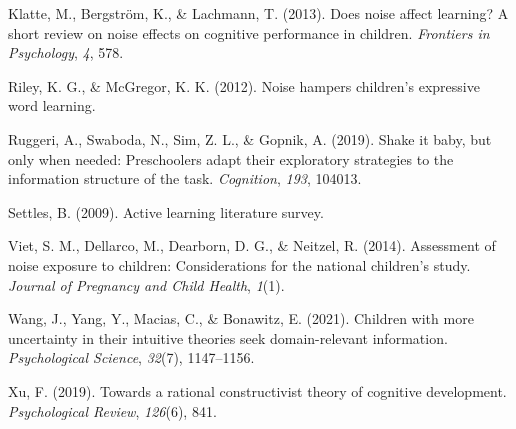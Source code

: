 \documentclass[10pt, letterpaper]{article}
\newenvironment{CSLReferences}%
  {}%
  {\par}
\begin{document}
\begin{CSLReferences}{1}{0}
\leavevmode\hypertarget{ref-klatte2013}{}%
Klatte, M., Bergström, K., \& Lachmann, T. (2013). Does noise affect
learning? A short review on noise effects on cognitive performance in
children. \emph{Frontiers in Psychology}, \emph{4}, 578.

\leavevmode\hypertarget{ref-riley2012}{}%
Riley, K. G., \& McGregor, K. K. (2012). Noise hampers children's
expressive word learning.

\leavevmode\hypertarget{ref-ruggeri2019}{}%
Ruggeri, A., Swaboda, N., Sim, Z. L., \& Gopnik, A. (2019). Shake it
baby, but only when needed: Preschoolers adapt their exploratory
strategies to the information structure of the task. \emph{Cognition},
\emph{193}, 104013.

\leavevmode\hypertarget{ref-settles2009}{}%
Settles, B. (2009). Active learning literature survey.

\leavevmode\hypertarget{ref-viet2014}{}%
Viet, S. M., Dellarco, M., Dearborn, D. G., \& Neitzel, R. (2014).
Assessment of noise exposure to children: Considerations for the
national children's study. \emph{Journal of Pregnancy and Child Health},
\emph{1}(1).

\leavevmode\hypertarget{ref-wang2021}{}%
Wang, J., Yang, Y., Macias, C., \& Bonawitz, E. (2021). Children with
more uncertainty in their intuitive theories seek domain-relevant
information. \emph{Psychological Science}, \emph{32}(7), 1147--1156.

\leavevmode\hypertarget{ref-xu2019}{}%
Xu, F. (2019). Towards a rational constructivist theory of cognitive
development. \emph{Psychological Review}, \emph{126}(6), 841.

\end{CSLReferences}


\end{document}
